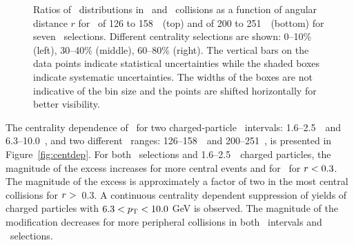 \begin{figure}[h]
{\begin{tabular}{ccc}
\end{tabular}
}
\caption{Ratios of \Dptr\ distributions in \PbPb\ and \pp\ collisions as a function of angular distance $r$ for \ptjet\ of 126 to 158~\GeV\ (top) and of 200 to 251~\GeV\ (bottom) for seven \pt\ selections.
Different centrality selections are shown: 0--10\% (left), 30--40\% (middle), 60--80\% (right).
The vertical bars on the data points indicate statistical uncertainties while the shaded boxes indicate systematic uncertainties.
The widths of the boxes are not indicative of the bin size and the points are shifted horizontally for better visibility.}
\label{fig:rdptr}
\end{figure}




The centrality dependence of \RDptr\ for two charged-particle \pt\ intervals: 1.6--2.5~\GeV\ and \mbox{6.3--10.0~\GeV}, and two different \ptjet\ ranges: 126--158~\GeV\ and 200--251~\GeV, is presented in Figure~\ref{fig:centdep}.
For both \ptjet\ selections and  1.6--2.5~\GeV\ charged particles, the magnitude of the excess increases for more central events and for \rvar\ for $\mbox{$r$} < 0.3$.
The magnitude of the excess is approximately a factor of two in the most central collisions for $\mbox{$r$} >$~0.3.
A continuous centrality dependent suppression of  yields of charged particles with $6.3 < \mbox{$p_{\mathrm{T}}$} < 10.0$ GeV is observed.
The magnitude of the modification decreases for more peripheral collisions in both \pt\ intervals and \ptjet\ selections.

